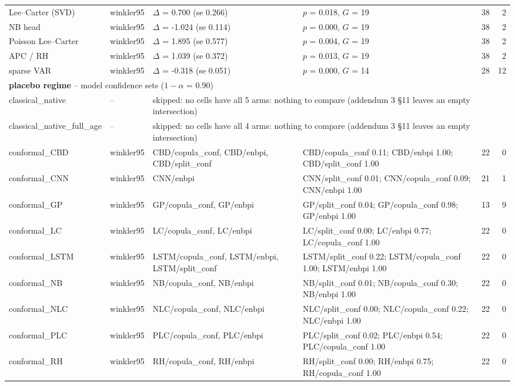 {\begin{longtable}{@{}llp{3.2cm}p{5.2cm}rr@{}}
Lee--Carter (SVD) & winkler95 & $\Delta$ = 0.700 (se 0.266) & $p$ = 0.018, $G$ = 19 & 38 & 2 \\
NB head & winkler95 & $\Delta$ = -1.024 (se 0.114) & $p$ = 0.000, $G$ = 19 & 38 & 2 \\
Poisson Lee--Carter & winkler95 & $\Delta$ = 1.895 (se 0.577) & $p$ = 0.004, $G$ = 19 & 38 & 2 \\
APC / RH & winkler95 & $\Delta$ = 1.039 (se 0.372) & $p$ = 0.013, $G$ = 19 & 38 & 2 \\
sparse VAR & winkler95 & $\Delta$ = -0.318 (se 0.051) & $p$ = 0.000, $G$ = 14 & 28 & 12 \\
\multicolumn{6}{l}{\textbf{placebo regime} -- model confidence sets ($1-\alpha$ = 0.90)} \\
\midrule
classical\_native & -- & \multicolumn{4}{p{9.6cm}}{skipped: no cells have all 5 arms: nothing to compare (addendum 3 §11 leaves an empty intersection)} \\
classical\_native\_full\_age & -- & \multicolumn{4}{p{9.6cm}}{skipped: no cells have all 4 arms: nothing to compare (addendum 3 §11 leaves an empty intersection)} \\
conformal\_CBD & winkler95 & CBD/copula\_conf, CBD/enbpi, CBD/split\_conf & CBD/copula\_conf 0.11; CBD/enbpi 1.00; CBD/split\_conf 1.00 & 22 & 0 \\
conformal\_CNN & winkler95 & CNN/enbpi & CNN/split\_conf 0.01; CNN/copula\_conf 0.09; CNN/enbpi 1.00 & 21 & 1 \\
conformal\_GP & winkler95 & GP/copula\_conf, GP/enbpi & GP/split\_conf 0.04; GP/copula\_conf 0.98; GP/enbpi 1.00 & 13 & 9 \\
conformal\_LC & winkler95 & LC/copula\_conf, LC/enbpi & LC/split\_conf 0.00; LC/enbpi 0.77; LC/copula\_conf 1.00 & 22 & 0 \\
conformal\_LSTM & winkler95 & LSTM/copula\_conf, LSTM/enbpi, LSTM/split\_conf & LSTM/split\_conf 0.22; LSTM/copula\_conf 1.00; LSTM/enbpi 1.00 & 22 & 0 \\
conformal\_NB & winkler95 & NB/copula\_conf, NB/enbpi & NB/split\_conf 0.01; NB/copula\_conf 0.30; NB/enbpi 1.00 & 22 & 0 \\
conformal\_NLC & winkler95 & NLC/copula\_conf, NLC/enbpi & NLC/split\_conf 0.00; NLC/copula\_conf 0.22; NLC/enbpi 1.00 & 22 & 0 \\
conformal\_PLC & winkler95 & PLC/copula\_conf, PLC/enbpi & PLC/split\_conf 0.02; PLC/enbpi 0.54; PLC/copula\_conf 1.00 & 22 & 0 \\
conformal\_RH & winkler95 & RH/copula\_conf, RH/enbpi & RH/split\_conf 0.00; RH/enbpi 0.75; RH/copula\_conf 1.00 & 22 & 0 \\

\end{longtable}}
